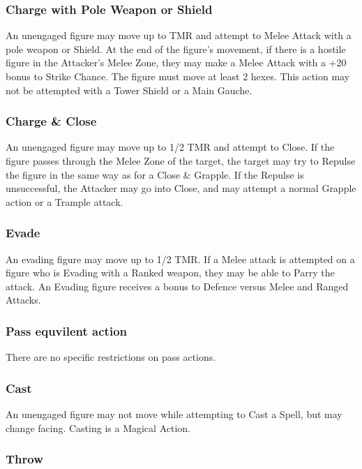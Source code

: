 \begin{multicols*}{3}
\subsubsection{Charge with Pole Weapon or Shield}

An unengaged figure may move up to TMR and attempt to Melee Attack
with a pole weapon or Shield. At the end of the figure's movement, if
there is a hostile figure in the Attacker's Melee Zone, they may make
a Melee Attack with a +20 bonus to Strike Chance. The figure must move
at least 2 hexes.  This action may not be attempted with a Tower
Shield or a Main Gauche.

\subsubsection{Charge \& Close}

An unengaged figure may move up to 1/2 TMR and attempt to Close. If
the figure passes through the Melee Zone of the target, the target may
try to Repulse the figure in the same way as for a Close \& Grapple.
If the Repulse is unsuccessful, the Attacker may go into Close, and
may attempt a normal Grapple action or a Trample attack.

\subsubsection{Evade}

An evading figure may move up to 1/2 TMR.  If a Melee attack is
attempted on a figure who is Evading with a Ranked weapon, they may be
able to Parry the attack. An Evading figure receives a bonus to
Defence versus Melee and Ranged Attacks.

\subsubsection{Pass equvilent action}

There are no specific restrictions on pass actions.

\subsubsection{Cast}

An unengaged figure may not move while attempting to Cast a Spell, but
may change facing.  Casting is a Magical Action.

\subsubsection{Throw}


\end{multicols*}
